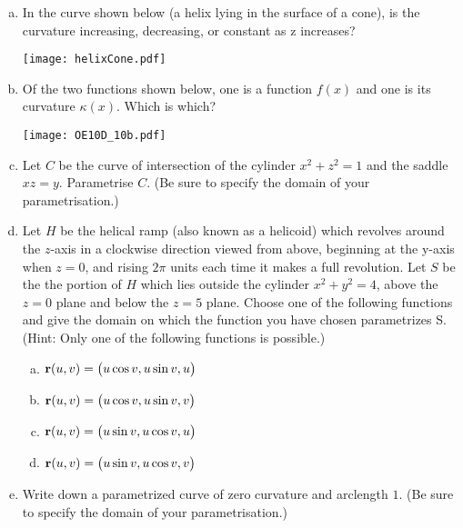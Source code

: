 \goodbreak
\begin{question}[M317 2010D] %

\begin{enumerate}[(a)]
\item
In the curve shown below (a helix lying in the surface of a cone), is the
curvature increasing, decreasing, or constant as z increases?

\begin{center}
       \texttt{[image: helixCone.pdf]}
\end{center}


\item
Of the two functions shown below, one is a function $f(x)$ and one is its
curvature $\kappa(x)$. Which is which?

\begin{center}
       \texttt{[image: OE10D\_10b.pdf]}
\end{center}



\item
Let $C$ be the curve of intersection of the cylinder $x^2 + z^2 = 1$ 
and the saddle $xz = y$. Parametrise $C$. (Be sure to specify the domain of
your parametrisation.)

\item 
Let $H$ be the helical ramp (also known as a helicoid) which revolves around
the $z$-axis in a clockwise direction viewed from above, beginning 
at the y-axis when $z = 0$, and rising $2\pi$ units each time it makes 
a full revolution. Let $S$ be the the portion
of $H$ which lies outside the cylinder $x^2 + y^2 = 4$, above the 
$z = 0$ plane and below the $z = 5$ plane.
Choose one of the following functions and give the domain on which the 
function you have chosen parametrizes S. (Hint: Only one of the following functions is possible.)
\begin{enumerate}[(a)]
\item 
$\mathbf{r}(u, v) = \big(u \cos v, u \sin v, u\big)$
\item 
$\mathbf{r}(u, v) = \big(u \cos v, u \sin v, v\big)$
\item 
$\mathbf{r}(u, v) = \big(u \sin v, u \cos v, u\big)$
\item 
$\mathbf{r}(u, v) = \big(u \sin v, u \cos v, v\big)$
\end{enumerate}

\item 
Write down a parametrized curve of zero curvature and arclength $1$.
(Be sure to specify the domain of your parametrisation.)


\end{enumerate}
\end{question}
